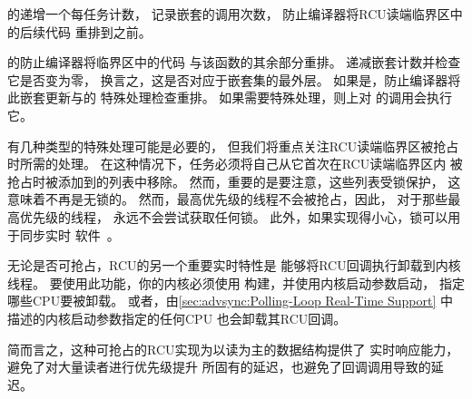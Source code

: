\begin{fcvref}
的递增一个每任务计数，
记录嵌套的调用次数，
防止编译器将RCU读端临界区中的后续代码
重排到之前。
\end{fcvref}

\begin{fcvref}
的防止编译器将临界区中的代码
与该函数的其余部分重排。
递减嵌套计数并检查它是否变为零，
换言之，这是否对应于嵌套集的最外层。
如果是，防止编译器将此嵌套更新与的
特殊处理检查重排。
如果需要特殊处理，则上对
的调用会执行它。

有几种类型的特殊处理可能是必要的，
但我们将重点关注RCU读端临界区被抢占时所需的处理。
在这种情况下，任务必须将自己从它首次在RCU读端临界区内
被抢占时被添加到的列表中移除。
然而，重要的是要注意，这些列表受锁保护，
这意味着不再是无锁的。
然而，最高优先级的线程不会被抢占，因此，
对于那些最高优先级的线程，
永远不会尝试获取任何锁。
此外，如果实现得小心，锁可以用于同步实时
软件~\cite{BjoernBrandenburgPhD,DipankarSarma2004OLSscalability}。
\end{fcvref}

\QuickQuizEnd

无论是否可抢占，RCU的另一个重要实时特性是
能够将RCU回调执行卸载到内核线程。
要使用此功能，你的内核必须使用
构建，并使用内核启动参数启动，
指定哪些CPU要被卸载。
或者，由\cref{sec:advsync:Polling-Loop Real-Time Support}
中描述的内核启动参数指定的任何CPU
也会卸载其RCU回调。

简而言之，这种可抢占的RCU实现为以读为主的数据结构提供了
实时响应能力，避免了对大量读者进行优先级提升
所固有的延迟，也避免了回调调用导致的延迟。

